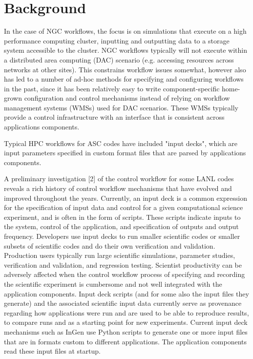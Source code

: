 \section{Background}

In the case of NGC workflows, the focus is on simulations that execute on a high performance 
computing cluster, inputting and outputting data to a storage system accessible to the cluster.  
NGC workflows typically will not execute within a distributed area 
computing (DAC) scenario (e.g. accessing resources across networks at other sites).  
This constrains workflow issues somewhat, however also has led to a number of ad-hoc methods for
specifying and configuring workflows in the past, since it has been relatively easy to write 
component-specific home-grown configuration and control mechanisms instead of relying on 
workflow management systems (WMSs) used for DAC scenarios.  These WMSs typically provide a 
control infrastructure with an interface that is consistent across applications components.  

Typical HPC workflows for ASC codes have included "input decks", which are input parameters
specified in custom format files that are parsed by applications components.

A preliminary investigation [2] of the control workflow for some LANL codes reveals a rich history of control workflow mechanisms that have evolved and improved throughout the years.  Currently, an input deck is a common expression for the specification of input data and control for a given computational science experiment, and is often in the form of scripts.   These scripts indicate inputs to the system, control of the application, and specification of outputs and output frequency.   Developers use input decks to run smaller scientific codes or smaller subsets of scientific codes and do their own verification and validation.  Production users typically run large scientific simulations, parameter studies, verification and validation, and regression testing.  Scientist productivity can be adversely affected when the control workflow process of specifying and recording the scientific experiment is cumbersome and not well integrated with the application components.  Input deck scripts (and for some also the input files they generate) and the associated scientific input data currently serve as provenance regarding how applications were run and are used to be able to reproduce results, to compare runs and as a starting point for new experiments.   Current input deck mechanisms such as InGen use Python scripts to generate one or more input files that are in formats custom to different applications.  The application components read these input files at startup.

